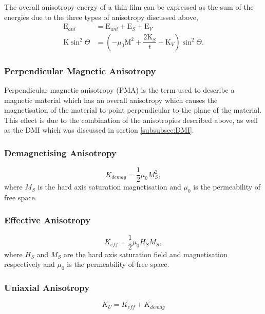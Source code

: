 		The overall anisotropy energy of a thin film can be expressed as the sum of the energies due to the three types of anisotropy discussed above, 
		\begin{equation}\label{eq:anisotropyenergy}
			\begin{split}
			\text{E}_{ani}&=\text{E}_{uni}+\text{E}_{S}+\text{E}_{V}\\
			\text{K}\sin^{2}\Theta&=\left(-\mu_{0}\text{M}^{2} +\dfrac{2\text{K}_{S}}{t}+\text{K}_{V}\right)\sin^{2}\Theta.
			\end{split}
		\end{equation}
		
		\subsubsection*{Perpendicular Magnetic Anisotropy}\label{subsubsec:PMA}
		Perpendicular magnetic anisotropy (PMA) is the term used to describe a magnetic material which has an overall anisotropy which causes the magnetisation of the material to point perpendicular to the plane of the material. This effect is due to the combination of the anisotropies described above, as well as the DMI which was discussed in section \ref{subsubsec:DMI}.

        \subsubsection*{Demagnetising Anisotropy}\label{subsubsec:DemagAni}
        \begin{equation}
            K_{demag}=\dfrac{1}{2}\mu_{0}M^{2}_{S},
        \end{equation}
        where $M_{S}$ is the hard axis saturation magnetisation and $\mu_{0}$ is the permeability of free space.

        \subsubsection*{Effective Anisotropy}\label{subsubsec:EffAni}
        \begin{equation}
            K_{eff}=\dfrac{1}{2}\mu_{0}H_{S}M_{S},
        \end{equation}
        where $H_{S}$ and $M_{S}$ are the hard axis saturation field and magnetisation respectively and $\mu_{0}$ is the permeability of free space.

        \subsubsection*{Uniaxial Anisotropy}\label{subsubsec:UniAni}
        \begin{equation}
            K_{U}=K_{eff}+K_{demag}
        \end{equation}

